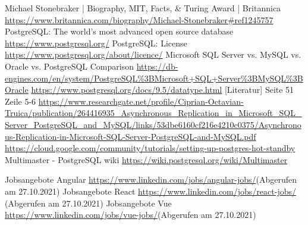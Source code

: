 \begin{thebibliography}{HR08}
   Michael Stonebraker | Biography, MIT, Facts, \& Turing Award | Britannica \url{https://www.britannica.com/biography/Michael-Stonebraker#ref1245757}
   PostgreSQL: The world's most advanced open source database \url{https://www.postgresql.org/}
   PostgreSQL: License \url{https://www.postgresql.org/about/licence/}
   Microsoft SQL Server vs. MySQL vs. Oracle vs. PostgreSQL Comparison \url{https://db-engines.com/en/system/PostgreSQL%3BMicrosoft+SQL+Server%3BMySQL%3BOracle}
   \url{https://www.postgresql.org/docs/9.5/datatype.html}
   [Literatur] Seite 51 Zeile 5-6 \url{https://www.researchgate.net/profile/Ciprian-Octavian-Truica/publication/264416935_Asynchronous_Replication_in_Microsoft_SQL_Server_PostgreSQL_and_MySQL/links/53dbe6160cf216e4210c0375/Asynchronous-Replication-in-Microsoft-SQL-Server-PostgreSQL-and-MySQL.pdf}
   \url{https://cloud.google.com/community/tutorials/setting-up-postgres-hot-standby}
   Multimaster - PostgreSQL wiki \url{https://wiki.postgresql.org/wiki/Multimaster}

   Jobsangebote Angular \url{https://www.linkedin.com/jobs/angular-jobs/}(Abgerufen am 27.10.2021)
   Jobsangebote React \url{https://www.linkedin.com/jobs/react-jobs/}  (Abgerufen am 27.10.2021)
   Jobsangebote Vue \url{https://www.linkedin.com/jobs/vue-jobs/}(Abgerufen am 27.10.2021)


\end{thebibliography}
